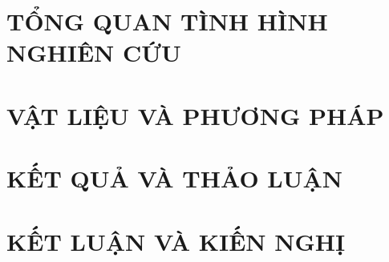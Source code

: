 \documentclass[a4paper]{article}
\begin{document}
\pagebreak

\section{TỔNG QUAN TÌNH HÌNH NGHIÊN CỨU}


\pagebreak

\section{VẬT LIỆU VÀ PHƯƠNG PHÁP}


\pagebreak

\section{KẾT QUẢ VÀ THẢO LUẬN}


\pagebreak

\section*{KẾT LUẬN VÀ KIẾN NGHỊ}


\pagebreak

\renewcommand*\refname{\centering\fontsize{13pt}{15pt}\selectfont{TÀI LIỆU THAM KHẢO}}
\label{Tai_Lieu_Tham_Khao}



\end{document}

